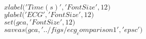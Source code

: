  \hspace*{-2em}{\scriptsize 77}$  xlabel($\color{mdarkgrey}$'Time (s)'$\color{black}$, $\color{mdarkgrey}$'FontSize'$\color{black}$, 12)$\\
 \hspace*{-2em}{\scriptsize 78}$  ylabel($\color{mdarkgrey}$'ECG'$\color{black}$, $\color{mdarkgrey}$'FontSize'$\color{black}$, 12)$\\
 \hspace*{-2em}{\scriptsize 79}$  set(gca, $\color{mdarkgrey}$'FontSize'$\color{black}$, 12)$\\
 \hspace*{-2em}{\scriptsize 80}$  saveas(gca, $\color{mdarkgrey}$'../figs/ecg_comparison1'$\color{black}$, $\color{mdarkgrey}$'epsc'$\color{black}$)$\\
 \hspace*{-2em}{\scriptsize 81}$  $\\
